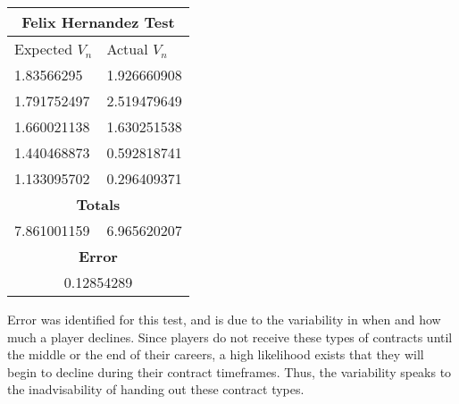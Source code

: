 \documentclass[12pt]{article}
\begin{document}
\begin{center}
\begin{tabular}{ |p{2.4cm}||p{2.5cm}|  }
 \hline
 \end{tabular}
\quad
\begin{tabular}{ |p{2.5cm}||p{2cm}|  }
\hline
\multicolumn{2}{|c|}{Felix Hernandez Test} \\
\hline
Expected $V_n$ & Actual $V_n$ \\
\hline
 1.83566295 & 1.926660908   \\
\hline
1.791752497 &   2.519479649 \\
\hline
1.660021138 & 1.630251538  \\
\hline
1.440468873  & 0.592818741  \\
\hline
1.133095702 & 0.296409371  \\
 \hline
 \multicolumn{2}{|c|}{\textbf{Totals}} \\
 \hline
 7.861001159 & 6.965620207 \\
 \hline
 \multicolumn{2}{|c|}{\textbf{Error}} \\
 \hline
  \multicolumn{2}{|c|}{0.12854289} \\
 \hline
 \end{tabular}
\end{center}
Error was identified for this test, and is due to the variability in when and how much a player declines.  Since players do not receive these types of contracts until the middle or the end of their careers, a high likelihood exists that they will begin to decline during their contract timeframes.  Thus, the variability speaks to the inadvisability of handing out these contract types.\\
\end{document}
